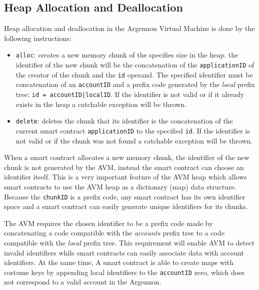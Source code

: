 \documentclass[11pt, a4paper]{report}
\begin{document}
    \subsection{Heap Allocation and Deallocation}\label{subsec:heap-allocation-instructions}

    Heap allocation and deallocation in the Argennon Virtual Machine is done by the following instructions:

    \begin{itemize}
        \item \texttt{alloc}: creates a new memory chunk of the specifies size in the heap. the identifier
        of the new chunk will be the concatenation of the \texttt{applicationID} of the creator of the chunk and
        the \texttt{id} operand. The specified identifier must be concatenation of
        an \texttt{accountID} and a prefix code
        generated by the \emph{local} prefix tree: \texttt{id = accountID|localID}. If the identifier is not valid or
        if it already exists in the heap a catchable exception will be thrown.

        \item \texttt{delete}: deletes the chunk that its identifier is the concatenation of the current smart
        contract \texttt{applicationID} to the specified \texttt{id}. If the identifier is not valid or
        if the chunk was not found a catchable exception will be thrown.
    \end{itemize}

    When a smart contract allocates a new memory chunk, the identifier of the new chunk is not generated by
    the AVM, instead the smart contract can choose an identifier itself. This is a very important feature of
    the AVM heap which allows smart contracts to use the AVM heap as a dictionary (map) data structure.
    Because the \texttt{chunkID} is a prefix code, any smart contract has its own identifier space and a smart contract
    can easily generate unique identifiers for its chunks.

    The AVM requires the chosen identifier to be a prefix code made by concatenating a code compatible with
    the \emph{accounts} prefix tree to a code compatible with the \emph{local} prefix tree. This requirement will
    enable AVM to detect invalid identifiers while smart contracts can easily associate data with account identifiers.
    At the same time, A smart contract is able to create maps with costume keys by appending local identifiers
    to the \texttt{accountID} zero, which does not correspond to a valid account in the Argennon.
\end{document}
